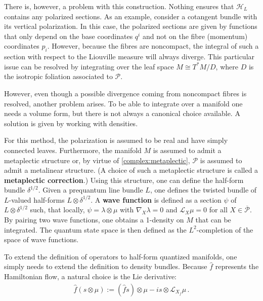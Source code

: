 \begin{construct}
        There is, however, a problem with this construction. Nothing ensures that $\mathcal{H}_L$ contains any polarized sections. As an example, consider a cotangent bundle with its vertical polarization. In this case, the polarized sections are given by functions that only depend on the base coordinates $q^i$ and not on the fibre (momentum) coordinates $p_i$. However, because the fibres are noncompact, the integral of such a section with respect to the Liouville measure will always diverge. This particular issue can be resolved by integrating over the leaf space $M\cong T^*M/D$, where $D$ is the isotropic foliation associated to $\mathcal{P}$.
    \end{construct}

    However, even though a possible divergence coming from noncompact fibres is resolved, another problem arises. To be able to integrate over a manifold one needs a volume form, but there is not always a canonical choice available. A solution is given by working with densities.
    \begin{method}
        For this method, the polarization is assumed to be real and have simply connected leaves. Furthermore, the manifold $M$ is assumed to admit a metaplectic structure or, by virtue of \cref{complex:metaplectic}, $\mathcal{P}$ is assumed to admit a metalinear structure. (A choice of such a metaplectic structure is called a \textbf{metaplectic correction}.) Using this structure, one can define the half-form bundle $\delta^{1/2}$. Given a prequantum line bundle $L$, one defines the twisted bundle of $L$-valued half-forms $L\otimes\delta^{1/2}$. A \textbf{wave function} is defined as a section $\psi$ of $L\otimes\delta^{1/2}$ such, that locally, $\psi=\lambda\otimes\mu$ with $\nabla_X\lambda=0$ and $\mathcal{L}_X\mu=0$ for all $X\in\overline{\mathcal{P}}$. By pairing two wave functions, one obtains a 1-density on $M$ that can be integrated. The quantum state space is then defined as the $L^2$-completion of the space of wave functions.

        To extend the definition of operators to half-form quantized manifolds, one simply needs to extend the definition to density bundles. Because $\widehat{f}$ represents the Hamiltonian flow, a natural choice is the Lie derivative:
        \begin{gather}
            \widehat{f}(s\otimes\mu) := (\widehat{f}s)\otimes\mu - is\otimes\mathcal{L}_{X_f}\mu\,.
        \end{gather}
    \end{method}

